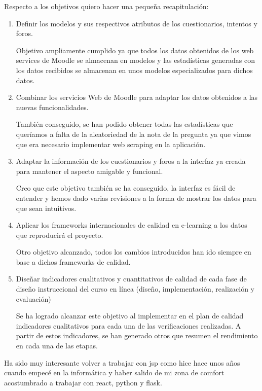 Respecto a los objetivos quiero hacer una pequeña recapitulación:
\begin{enumerate}
    \item Definir los modelos y sus respectivos atributos de los cuestionarios, intentos y foros.

    Objetivo ampliamente cumplido ya que todos los datos obtenidos de los web services de Moodle se almacenan en modelos y las estadísticas generadas con los datos recibidos se almacenan en unos modelos especializados para dichos datos.
    
    \item Combinar los servicios Web de Moodle para adaptar los datos obtenidos a las nuevas funcionalidades.

    También conseguido, se han podido obtener todas las estadísticas que queríamos a falta de la aleatoriedad de la nota de la pregunta ya que vimos que era necesario implementar web scraping en la aplicación.
    
    \item Adaptar la información de los cuestionarios y foros a la interfaz ya creada para mantener el aspecto amigable y funcional.

    Creo que este objetivo también se ha conseguido, la interfaz es fácil de entender y hemos dado varias revisiones a la forma de mostrar los datos para que sean intuitivos.
    
    \item Aplicar los frameworks internacionales de calidad en e-learning a los datos que reproducirá el proyecto.

    Otro objetivo alcanzado, todos los cambios introducidos han ido siempre en base a dichos frameworks de calidad.
    
    \item Diseñar indicadores cualitativos y cuantitativos de calidad de cada fase de diseño instruccional del curso en línea (diseño, implementación, realización y evaluación)\cite{previotfg}

    Se ha logrado alcanzar este objetivo al implementar en el plan de calidad indicadores cualitativos para cada una de las verificaciones realizadas. A partir de estos indicadores, se han generado otros que resumen el rendimiento en cada una de las etapas.
\end{enumerate}

Ha sido muy interesante volver a trabajar con jsp como hice hace unos años cuando empecé en la informática y haber salido de mi zona de comfort acostumbrado a trabajar con react, python y flask.

